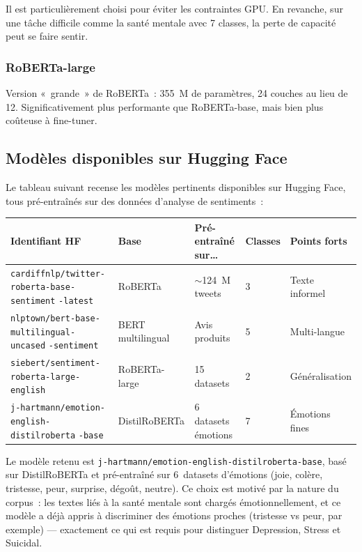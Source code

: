 \documentclass[12pt,a4paper]{article}
\begin{document}
Il est particulièrement choisi pour éviter les contraintes GPU. En revanche, sur une
tâche difficile comme la santé mentale avec 7 classes, la perte de capacité peut se
faire sentir.

\subsubsection{RoBERTa-large}

Version «~grande~» de RoBERTa~: 355~M de paramètres, 24 couches au lieu de 12.
Significativement plus performante que RoBERTa-base, mais bien plus coûteuse à
fine-tuner.

\subsection{Modèles disponibles sur Hugging Face}

Le tableau suivant recense les modèles pertinents disponibles sur Hugging Face, tous
pré-entraînés sur des données d'analyse de sentiments~:

\begin{center}
\begin{tabular}{@{}L{4.5cm}C{2cm}C{3.2cm}C{0.8cm}C{2cm}@{}}
  \toprule
  Identifiant HF & Base & Pré-entraîné sur\dots & Classes & Points forts \\
  \midrule
  \texttt{cardiffnlp/twitter-} \newline \texttt{roberta-base-sentiment} \newline \texttt{-latest} & RoBERTa & $\sim$124~M tweets & 3 & Texte informel \\
  \texttt{nlptown/bert-base-} \newline \texttt{multilingual-uncased} \newline \texttt{-sentiment} & BERT multilingual & Avis produits & 5 & Multi-langue \\
  \texttt{siebert/sentiment-} \newline \texttt{roberta-large-english} & RoBERTa-large & 15 datasets & 2 & Généralisation \\
  \texttt{j-hartmann/emotion-} \newline \texttt{english-distilroberta} \newline \texttt{-base} & DistilRoBERTa & 6 datasets émotions & 7 & Émotions fines \\
  \bottomrule
\end{tabular}
\end{center}

\begin{note}
Le modèle retenu est \texttt{j-hartmann/emotion-english-distilroberta-base}, basé sur
DistilRoBERTa et pré-entraîné sur 6~datasets d'émotions (joie, colère, tristesse, peur,
surprise, dégoût, neutre). Ce choix est motivé par la nature du corpus~: les textes liés
à la santé mentale sont chargés émotionnellement, et ce modèle a déjà appris à
discriminer des émotions proches (tristesse vs peur, par exemple) — exactement ce qui
est requis pour distinguer Depression, Stress et Suicidal.
\end{note}
\end{document}
